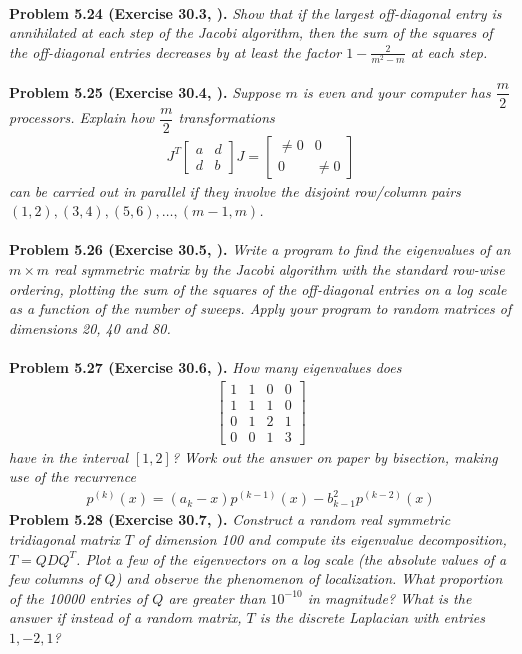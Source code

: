 \documentclass[a4paper,oneside]{book}
\numberwithin{equation}{chapter}
\begin{document}
\\
\textbf{Problem 5.24 (Exercise 30.3, \cite{1}).}  \textit{Show that if the largest off-diagonal entry is annihilated at each step of the Jacobi algorithm, then the sum of the squares of the off-diagonal entries decreases by at least the factor $1 - \frac{2}{{{m^2} - m}}$ at each step.}\\
\\
\textbf{Problem 5.25 (Exercise 30.4, \cite{1}).} \textit{Suppose $m$ is even and your computer has $\dfrac{m}{2}$ processors. Explain how $\dfrac{m}{2}$ transformations}
\begin{align}
{J^T}\left[ {\begin{array}{*{20}{c}}
a&d\\
d&b
\end{array}} \right]J = \left[ {\begin{array}{*{20}{c}}
{ \ne 0}&0\\
0&{ \ne 0}
\end{array}} \right]
\end{align}
\textit{can be carried out in parallel if they involve the disjoint row/column pairs $\left( {1,2} \right),\left( {3,4} \right),\left( {5,6} \right), \ldots ,\left( {m - 1,m} \right)$.}\\
\\
\textbf{Problem 5.26 (Exercise 30.5, \cite{1}).} \textit{Write a program to find the eigenvalues of an $m\times m$ real symmetric matrix by the Jacobi algorithm with the standard row-wise ordering, plotting the sum of the squares of the off-diagonal entries on a log scale as a function of the number of sweeps. Apply your program to random matrices of dimensions 20, 40 and 80.}\\
\\
\textbf{Problem 5.27 (Exercise 30.6, \cite{1}).} \textit{How many eigenvalues does}
\begin{align}
\left[ {\begin{array}{*{20}{c}}
1&1&0&0\\
1&1&1&0\\
0&1&2&1\\
0&0&1&3
\end{array}} \right]
\end{align}
\textit{have in the interval $\left[1,2\right]$? Work out the answer on paper by bisection, making use of the recurrence}
\begin{align}
{p^{\left( k \right)}}\left( x \right) = \left( {{a_k} - x} \right){p^{\left( {k - 1} \right)}}\left( x \right) - b_{k - 1}^2{p^{\left( {k - 2} \right)}}\left( x \right)
\end{align}
\textbf{Problem 5.28 (Exercise 30.7, \cite{1}).} \textit{Construct a random real symmetric tridiagonal matrix $T$ of dimension 100 and compute its eigenvalue decomposition, $T=QDQ^T$. Plot a few of the eigenvectors on a log scale (the absolute values of a few columns of $Q$) and observe the phenomenon of localization. What proportion of the 10000 entries of $Q$ are greater than $10^{-10}$ in magnitude? What is the answer if instead of a random matrix, $T$ is the discrete Laplacian with entries $1,-2,1$?}
\end{document}
